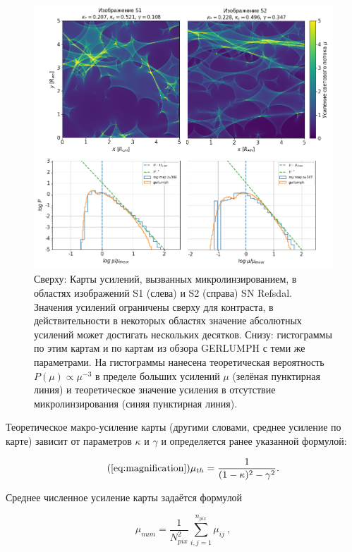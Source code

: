 \begin{figure}[H]
    \centering
	\includegraphics[width=\textwidth]{microlensing/images/mapsandhistS12.png}
	\caption{Сверху: Карты усилений, вызванных микролинзированием, в областях изображений S1 (слева) и S2 (справа) SN Refsdal. Значения усилений ограничены сверху для контраста, в действительности в некоторых областях значение абсолютных усилений может достигать нескольких десятков. Снизу: гистограммы по этим картам и по картам из обзора GERLUMPH с теми же параметрами. На гистограммы нанесена теоретическая вероятность $P(\mu)\propto \mu^{-3}$ в пределе больших усилений $\mu$ (зелёная пунктирная линия) и теоретическое значение усиления в отсутствие микролинзирования (синяя пунктирная линия).}
	\label{fig:mymaps}
\end{figure}


Теоретическое макро-усиление карты (другими словами, среднее усиление по карте) зависит от параметров $\kappa$ и $\gamma$ и определяется ранее указанной формулой:

\begin{equation}\tag{\ref{eq:magnification}}
\mu_{th} = \frac{1}{(1-\kappa)^2-\gamma^2}.
\end{equation}

Среднее численное усиление карты задаётся формулой

\begin{equation}\label{avmag}
\mu_{num} = \frac{1}{N_{pix}^2}\sum_{i,j=1}^{n_{pix}}\mu_{ij} \ ,
\end{equation}

